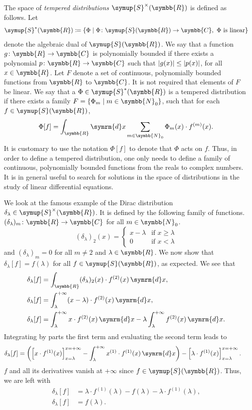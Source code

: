 \documentclass[11pt, a4paper]{article}
\theoremstyle{definition}
\newcommand{\rr}{\symbb{R}}
\newcommand{\cc}{\symbb{C}}
\newcommand{\nn}{\symbb{N}_0}
\newcommand{\dirac}{\delta}
\newcommand{\schwartz}{\symup{S}}
\newcommand{\schwartzr}{\schwartz(\rr)}
\newcommand{\dist}{\schwartz^\times}
\newcommand{\distr}{\dist(\rr)}
\newcommand{\distar}{\schwartz^*(\rr)}
\newcommand{\family}{F}
\DeclarePairedDelimiter{\abs}{\lvert}{\rvert}
\newcommand{\der}{\mathop{}\!\symrm{d}}
\begin{document}
    The space of \textit{tempered distributions} $\distr$ is defined as follows. Let
    \[
    \distar \coloneq \{\Phi \mid \Phi \colon \schwartzr \rightarrow \cc, \text{ $\Phi$ is linear}\}
    \] denote the algebraic dual of $\schwartzr$.  We say that a function $g \colon \rr \rightarrow \cc$ is polynomially bounded if there exists a polynomial $p \colon \rr \rightarrow \cc$ such that $\abs{g(x)} \leq \abs{p(x)}$, for all $x\in \rr$. Let $\family$ denote a set of continuous, polynomially bounded functions from $\rr$ to $\cc$. It is not required that elements of $\family$ be linear. We say that a $\Phi \in \distar$ is a tempered distribution if there exists a family $\family = \{\Phi_m \mid m \in \nn\}$, such that for each $f\in \schwartzr$,
    \[
    \Phi[f] = \int_{\rr} \der x \sum_{m \in \nn} \Phi_m (x) \cdot f^{(m)} (x).
    \]
    It is customary to use the notation $\Phi[f]$ to denote that $\Phi$ acts on $f$. Thus, in order to define a tempered distribution, one only needs to define a family of  continuous, polynomially bounded functions from the reals to complex numbers. It is in general useful to search for solutions in the space of distributions in the study of linear differential equations.

    We look at the famous example of the Dirac distribution $\dirac_\lambda \in \distr$. It is defined by the following family of functions. $(\dirac_\lambda)_m \colon \rr \rightarrow \cc$ for all $m \in \nn$.
    \[
    (\dirac_\lambda)_2 (x) =
    \begin{cases}
        x - \lambda & \text{if $x \geq \lambda$}\\
        0 & \text{if $x < \lambda$}
    \end{cases}
    \]
    and $(\dirac_\lambda)_m = 0$ for all $m \neq 2$ and $\lambda \in \rr$. We now show that $\dirac_\lambda[f] = f(\lambda)$ for all $f \in \schwartzr$, as expected. We see that
    \begin{align*}
        \dirac_\lambda [f] &= \int_{\rr} (\dirac_\lambda)_2 (x) \cdot f^{(2)} (x) \der x,\\
        \dirac_\lambda [f] &= \int_\lambda^{+\infty} (x - \lambda)\cdot f^{(2)} (x) \der x,\\
        \dirac_\lambda [f] &= \int_\lambda^{+\infty} x\cdot f^{(2)} (x) \der x - \lambda \int_\lambda^{+\infty} f^{(2)} (x) \der x.
    \end{align*}
    Integrating by parts the first term and evaluating the second term leads to
    \begin{align*}
        \dirac_\lambda [f] &= \left(\left[x \cdot f^{(1)}(x)\right]_{x = \lambda}^{x = +\infty} - \int_\lambda^{+\infty} x^{(1)}\cdot f^{(1)} (x) \der x\right) - \left[\lambda \cdot f^{(1)} (x)\right]_{x = \lambda}^{x = +\infty}.
    \end{align*}
    $f$ and all its derivatives vanish at $+\infty$ since $f \in \schwartzr$. Thus, we are left with
    \begin{align*}
        \dirac_\lambda [f] &= \lambda \cdot f^{(1)}(\lambda) - f(\lambda) - \lambda \cdot f^{(1)}(\lambda),\\
        \dirac_\lambda [f] &= f(\lambda).
    \end{align*}
\end{document}
